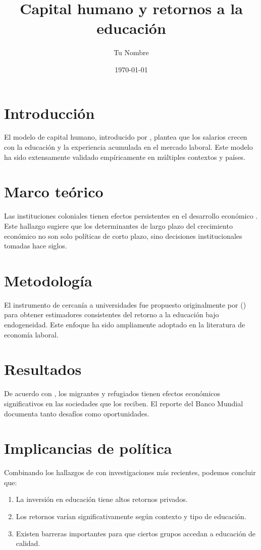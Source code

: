 \documentclass[12pt, a4paper]{article}
\title{Capital humano y retornos a la educación}
\author{Tu Nombre}
\date{\today}
\begin{document}
\maketitle

\section{Introducción}

El modelo de capital humano, introducido por \textcite{mincer1974}, plantea 
que los salarios crecen con la educación y la experiencia acumulada en el 
mercado laboral. Este modelo ha sido extensamente validado empíricamente en 
múltiples contextos y países.

\section{Marco teórico}

Las instituciones coloniales tienen efectos persistentes en el desarrollo 
económico \parencite{acemoglu2001}. Este hallazgo sugiere que los 
determinantes de largo plazo del crecimiento económico no son solo políticas 
de corto plazo, sino decisiones institucionales tomadas hace siglos.

\section{Metodología}

El instrumento de cercanía a universidades fue propuesto originalmente por 
\citeauthor{card1995} (\citeyear{card1995}) para obtener estimadores 
consistentes del retorno a la educación bajo endogeneidad. Este enfoque ha 
sido ampliamente adoptado en la literatura de economía laboral.

\section{Resultados}

De acuerdo con \textcite{world_bank_2023}, los migrantes y refugiados tienen 
efectos económicos significativos en las sociedades que los reciben. El 
reporte del Banco Mundial documenta tanto desafíos como oportunidades.

\section{Implicancias de política}

Combinando los hallazgos de \textcite{mincer1974} con investigaciones más 
recientes, podemos concluir que:

\begin{enumerate}
  \item La inversión en educación tiene altos retornos privados.
  \item Los retornos varían significativamente según contexto y tipo de educación.
  \item Existen barreras importantes para que ciertos grupos accedan a educación 
        de calidad.
\end{enumerate}

\newpage
\printbibliography[title={Referencias}]
\end{document}
